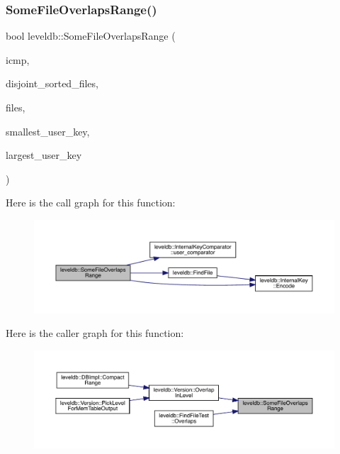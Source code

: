 \subsubsection{\texorpdfstring{SomeFileOverlapsRange()}{SomeFileOverlapsRange()}}
{\footnotesize\ttfamily bool leveldb\+::\+Some\+File\+Overlaps\+Range (\begin{DoxyParamCaption}\item[{const \mbox{\hyperlink{classleveldb_1_1_internal_key_comparator}{Internal\+Key\+Comparator}} \&}]{icmp,  }\item[{bool}]{disjoint\+\_\+sorted\+\_\+files,  }\item[{const std\+::vector$<$ \mbox{\hyperlink{structleveldb_1_1_file_meta_data}{File\+Meta\+Data}} $\ast$ $>$ \&}]{files,  }\item[{const \mbox{\hyperlink{classleveldb_1_1_slice}{Slice}} $\ast$}]{smallest\+\_\+user\+\_\+key,  }\item[{const \mbox{\hyperlink{classleveldb_1_1_slice}{Slice}} $\ast$}]{largest\+\_\+user\+\_\+key }\end{DoxyParamCaption})}

Here is the call graph for this function\+:
\nopagebreak
\begin{figure}[H]
\begin{center}
\leavevmode
\includegraphics[width=350pt]{namespaceleveldb_a1a6a370f17b20667b885b5b91159c5a9_cgraph}
\end{center}
\end{figure}
Here is the caller graph for this function\+:
\nopagebreak
\begin{figure}[H]
\begin{center}
\leavevmode
\includegraphics[width=350pt]{namespaceleveldb_a1a6a370f17b20667b885b5b91159c5a9_icgraph}
\end{center}
\end{figure}
\mbox{\label{namespaceleveldb_a576acf7326a43527670f08edd3e3e12b}} 
